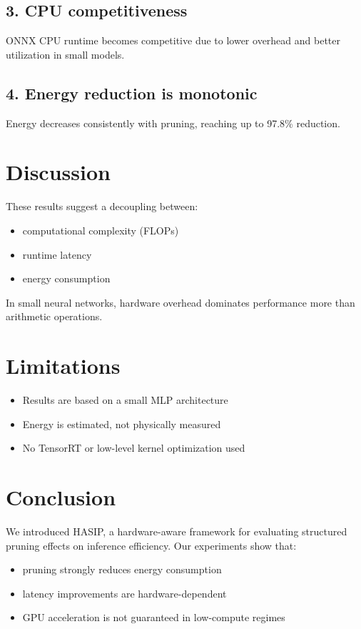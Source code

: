 \documentclass{article}
\begin{document}
\subsection{3. CPU competitiveness}
ONNX CPU runtime becomes competitive due to lower overhead and better utilization in small models.

\subsection{4. Energy reduction is monotonic}
Energy decreases consistently with pruning, reaching up to 97.8\% reduction.

\section{Discussion}

These results suggest a decoupling between:

\begin{itemize}
    \item computational complexity (FLOPs)
    \item runtime latency
    \item energy consumption
\end{itemize}

In small neural networks, hardware overhead dominates performance more than arithmetic operations.

\section{Limitations}

\begin{itemize}
    \item Results are based on a small MLP architecture
    \item Energy is estimated, not physically measured
    \item No TensorRT or low-level kernel optimization used
\end{itemize}

\section{Conclusion}

We introduced HASIP, a hardware-aware framework for evaluating structured pruning effects on inference efficiency. Our experiments show that:

\begin{itemize}
    \item pruning strongly reduces energy consumption
    \item latency improvements are hardware-dependent
    \item GPU acceleration is not guaranteed in low-compute regimes
\end{itemize}
\end{document}

